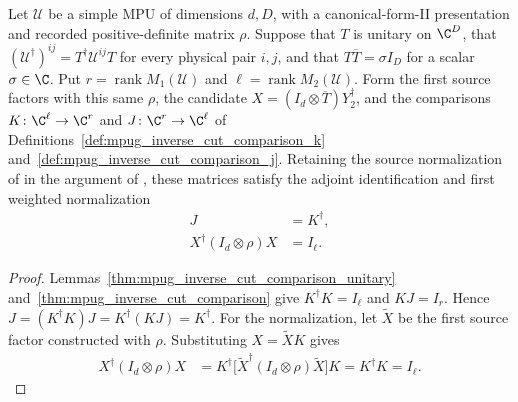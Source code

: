 \begin{lemma}
    \label{thm:mpug_inverse_cut_unitary_consequences}
    \leanok
    Let $\mathcal U$ be a simple MPU of dimensions $d,D$, with a
    canonical-form-II presentation and recorded positive-definite matrix
    $\rho$. Suppose that $T$ is unitary on $\C^D$, that
    $(\mathcal U^\dagger)^{ij}=T^\dagger\mathcal U^{ij}T$ for every
    physical pair $i,j$, and that $T\overline T=\sigma I_D$ for a scalar
    $\sigma\in\C$. Put $r=\operatorname{rank}M_1(\mathcal U)$ and
    $\ell=\operatorname{rank}M_2(\mathcal U)$.
    Form the first source factors with this same $\rho$,
    the candidate $X=(I_d\otimes\overline T)Y_2^\dagger$, and the comparisons
    $K\colon\C^\ell\to\C^r$ and $J\colon\C^r\to\C^\ell$ of
    Definitions~\ref{def:mpug_inverse_cut_comparison_k}
    and~\ref{def:mpug_inverse_cut_comparison_j}. Retaining the source
    normalization of \cite[lines~487--494]{Cirac2017MPU} in the argument of
    \cite[lines~5432--5487]{FrancoRubio2025MPUGauging}, these matrices satisfy
    the adjoint identification and first weighted normalization
    \begin{align}
        J                          & =K^\dagger, \\
        X^\dagger(I_d\otimes\rho)X & =I_\ell.
    \end{align}
\end{lemma}
\begin{proof}\leanok
    Lemmas~\ref{thm:mpug_inverse_cut_comparison_unitary}
    and~\ref{thm:mpug_inverse_cut_comparison} give
    $K^\dagger K=I_\ell$ and $KJ=I_r$. Hence
    $J=(K^\dagger K)J=K^\dagger(KJ)=K^\dagger$.
    For the normalization, let $\widetilde X$ be the first source factor
    constructed with $\rho$. Substituting $X=\widetilde XK$ gives
    \begin{align}
        X^\dagger(I_d\otimes\rho)X
         & =K^\dagger\bigl[\widetilde X^\dagger
            (I_d\otimes\rho)\widetilde X\bigr]K
        =K^\dagger K=I_\ell.
    \end{align}
\end{proof}

